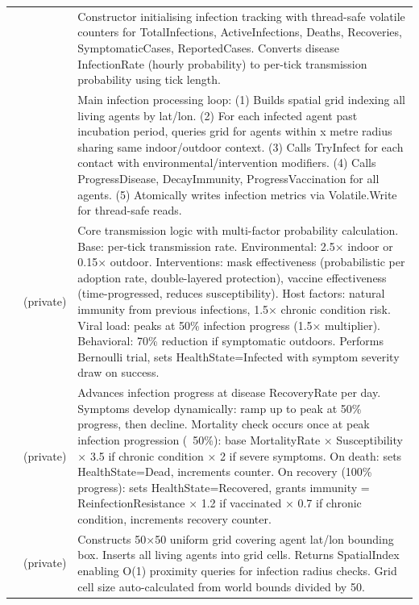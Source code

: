 \begin{longtable}{|L{4cm}|L{4cm}|L{6cm}|}
 & 
 & 
Constructor initialising infection tracking with thread-safe volatile counters for TotalInfections, ActiveInfections, Deaths, Recoveries, SymptomaticCases, ReportedCases. Converts disease InfectionRate (hourly probability) to per-tick transmission probability using tick length.\\
&  & 
Main infection processing loop: (1) Builds spatial grid indexing all living agents by lat/lon. (2) For each infected agent past incubation period, queries grid for agents within x metre radius sharing same indoor/outdoor context. (3) Calls TryInfect for each contact with environmental/intervention modifiers. (4) Calls ProgressDisease, DecayImmunity, ProgressVaccination for all agents. (5) Atomically writes infection metrics via Volatile.Write for thread-safe reads. \\
&  (private) & 
Core transmission logic with multi-factor probability calculation. Base: per-tick transmission rate. Environmental: 2.5× indoor or 0.15× outdoor. Interventions: mask effectiveness (probabilistic per adoption rate, double-layered protection), vaccine effectiveness (time-progressed, reduces susceptibility). Host factors: natural immunity from previous infections, 1.5× chronic condition risk. Viral load: peaks at 50\% infection progress (1.5× multiplier). Behavioral: 70\% reduction if symptomatic outdoors. Performs Bernoulli trial, sets HealthState=Infected with symptom severity draw on success. \\
&  (private) & 
Advances infection progress at disease RecoveryRate per day. Symptoms develop dynamically: ramp up to peak at 50\% progress, then decline. Mortality check occurs once at peak infection progression (~50\%): base MortalityRate × Susceptibility × 3.5 if chronic condition × 2 if severe symptoms. On death: sets HealthState=Dead, increments counter. On recovery (100\% progress): sets HealthState=Recovered, grants immunity = ReinfectionResistance × 1.2 if vaccinated × 0.7 if chronic condition, increments recovery counter. \\
&  (private) & 
Constructs 50×50 uniform grid covering agent lat/lon bounding box. Inserts all living agents into grid cells. Returns SpatialIndex enabling O(1) proximity queries for infection radius checks. Grid cell size auto-calculated from world bounds divided by 50. \\

\end{longtable}
